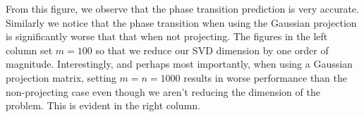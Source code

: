 From this figure, we observe that the phase transition prediction is very
accurate. Similarly we notice that the phase transition when using the Gaussian projection
is significantly worse that that when not projecting. The figures in the left column set
$m=100$ so that we reduce our SVD dimension by one order of magnitude. Interestingly, and
perhaps most importantly, when using a Gaussian projection matrix, setting $m=n=1000$
results in worse performance than the non-projecting case even though we aren't reducing
the dimension of the problem. This is evident in the right column.


\begin{figure}
\begin{center}
\end{center}
\end{figure}
